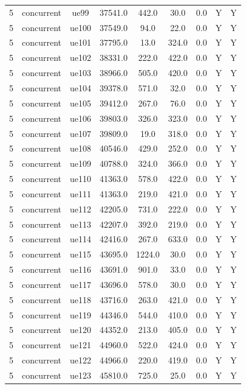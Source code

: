 \begin{table}[ht]
\begin{tabular}{|c|c|c|c|c|c|c|c|c|}
5 & concurrent & ue99 & 37541.0 & 442.0 & 30.0 & 0.0 & Y & Y \\
5 & concurrent & ue100 & 37549.0 & 94.0 & 22.0 & 0.0 & Y & Y \\
5 & concurrent & ue101 & 37795.0 & 13.0 & 324.0 & 0.0 & Y & Y \\
5 & concurrent & ue102 & 38331.0 & 222.0 & 422.0 & 0.0 & Y & Y \\
5 & concurrent & ue103 & 38966.0 & 505.0 & 420.0 & 0.0 & Y & Y \\
5 & concurrent & ue104 & 39378.0 & 571.0 & 32.0 & 0.0 & Y & Y \\
5 & concurrent & ue105 & 39412.0 & 267.0 & 76.0 & 0.0 & Y & Y \\
5 & concurrent & ue106 & 39803.0 & 326.0 & 323.0 & 0.0 & Y & Y \\
5 & concurrent & ue107 & 39809.0 & 19.0 & 318.0 & 0.0 & Y & Y \\
5 & concurrent & ue108 & 40546.0 & 429.0 & 252.0 & 0.0 & Y & Y \\
5 & concurrent & ue109 & 40788.0 & 324.0 & 366.0 & 0.0 & Y & Y \\
5 & concurrent & ue110 & 41363.0 & 578.0 & 422.0 & 0.0 & Y & Y \\
5 & concurrent & ue111 & 41363.0 & 219.0 & 421.0 & 0.0 & Y & Y \\
5 & concurrent & ue112 & 42205.0 & 731.0 & 222.0 & 0.0 & Y & Y \\
5 & concurrent & ue113 & 42207.0 & 392.0 & 219.0 & 0.0 & Y & Y \\
5 & concurrent & ue114 & 42416.0 & 267.0 & 633.0 & 0.0 & Y & Y \\
5 & concurrent & ue115 & 43695.0 & 1224.0 & 30.0 & 0.0 & Y & Y \\
5 & concurrent & ue116 & 43691.0 & 901.0 & 33.0 & 0.0 & Y & Y \\
5 & concurrent & ue117 & 43696.0 & 578.0 & 30.0 & 0.0 & Y & Y \\
5 & concurrent & ue118 & 43716.0 & 263.0 & 421.0 & 0.0 & Y & Y \\
5 & concurrent & ue119 & 44346.0 & 544.0 & 410.0 & 0.0 & Y & Y \\
5 & concurrent & ue120 & 44352.0 & 213.0 & 405.0 & 0.0 & Y & Y \\
5 & concurrent & ue121 & 44960.0 & 522.0 & 424.0 & 0.0 & Y & Y \\
5 & concurrent & ue122 & 44966.0 & 220.0 & 419.0 & 0.0 & Y & Y \\
5 & concurrent & ue123 & 45810.0 & 725.0 & 25.0 & 0.0 & Y & Y \\

\end{tabular}
\end{table}
